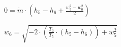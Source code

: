 \( 0 = \dot{m} \cdot \left( h_5 - h_6 + \frac{w_5^2 - w_0^2}{2} \right) \)  

\( w_6 = \sqrt{-2 \cdot \left( \frac{T_0}{T_5} \cdot (h_5 - h_6) \right) + w_5^2} \)